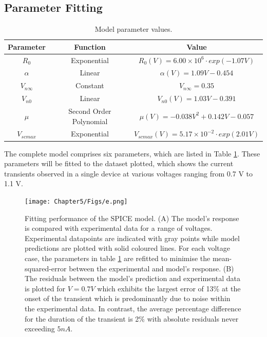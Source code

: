 \subsection[Parameter Fitting]{Parameter Fitting}

\begin{table}[ht]
    \caption{Model parameter values.}
    \centering
    \begin{tabular}{|c|c|c|}
    \hline
    Parameter   & Function                & Value                                      \\ \hline
    $R_0$       & Exponential             & $R_0(V) = 6.00 \times 10^6 \cdot exp(-1.07V)$         \\ \hline
    $\alpha$    & Linear                  & $\alpha(V) = 1.09V -0.454$                 \\ \hline
    $V_{n\infty}$ & Constant                & $V_{n\infty} = 0.35$                         \\ \hline
    $V_{n0}$    & Linear                  & $V_{n0}(V) = 1.03V - 0.391 $               \\ \hline
    $\mu$       & Second Order Polynomial & $\mu(V) = -0.038V^2 + 0.142V - 0.057$      \\ \hline
    $V_{scmax}$ & Exponential             & $V_{scmax}(V) = 5.17 \times 10^{-2} \cdot exp(2.01V)$ \\ \hline
    \end{tabular}
    \label{table:5b}
\end{table}

\noindent The complete model comprises six parameters, which are listed in Table \ref{table:5b}. These parameters will be fitted to the dataset plotted, which shows the current transients observed in a single device at various voltages ranging from 0.7 V to 1.1 V.\\

\begin{figure}[htbp!] 
    \centering    
    \texttt{[image: Chapter5/Figs/e.png]}
    \caption[Fitting performance of the SPICE model.]{Fitting performance of the SPICE model. (A) The model’s response is compared with experimental data for a range of voltages. Experimental datapoints are indicated with gray points while model predictions are plotted with solid coloured lines. For each voltage case, the parameters in table \ref{table:5b} are refitted to minimise the mean-squared-error between the experimental and model's response. (B) The residuals between the model's prediction and experimental data is plotted for $V=0.7V$  which exhibits the largest error of 13\% at the onset of the transient which is predominantly due to noise within the experimental data. In contrast, the average percentage difference for the duration of the transient is 2\% with absolute residuals never exceeding $5nA$.}
    \label{fig:5e}
\end{figure}

